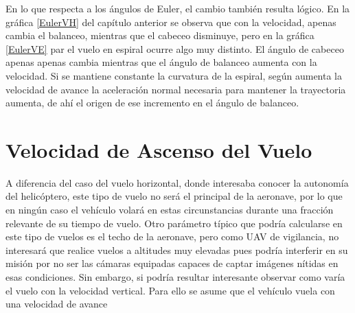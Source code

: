 En lo que respecta a los ángulos de Euler, el cambio también resulta lógico. En la gráfica \ref{EulerVH} del capítulo anterior se observa que con la velocidad, apenas cambia el balanceo, mientras que el cabeceo disminuye, pero en la gráfica \ref{EulerVE} par el vuelo en espiral ocurre algo muy distinto.
El ángulo de cabeceo apenas apenas cambia mientras que el ángulo de balanceo aumenta con la velocidad. Si se mantiene constante la curvatura de la espiral, según aumenta la velocidad de avance la aceleración normal necesaria para mantener la trayectoria aumenta, de ahí el origen de ese incremento en el ángulo de balanceo.

\section{Velocidad de Ascenso del Vuelo}

A diferencia del caso del vuelo horizontal, donde interesaba conocer la autonomía del helicóptero, este tipo de vuelo no será el principal de la aeronave, por lo que en ningún caso el vehículo volará en estas circunstancias durante una fracción relevante de su tiempo de vuelo. Otro parámetro típico que podría calcularse en este tipo de vuelos es el techo de la aeronave, pero como UAV de vigilancia, no interesará que realice vuelos a altitudes muy elevadas pues podría interferir en su misión por no ser las cámaras equipadas capaces de captar imágenes nítidas en esas condiciones.
Sin embargo, si podría resultar interesante observar como varía el vuelo con la velocidad vertical. Para ello se asume que el vehículo vuela con una velocidad de avance 
